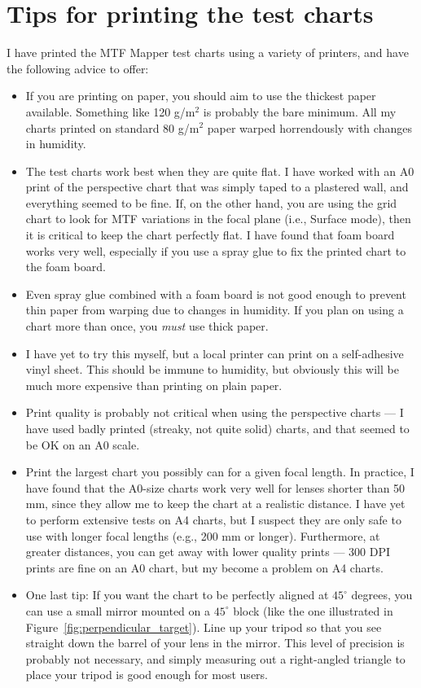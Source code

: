 \documentclass[a4paper]{article}
\begin{document}
\appendix

\section{Tips for printing the test charts}
\label{sec:tips}
I have printed the MTF Mapper test charts using a variety of printers, and
have the following advice to offer:
\begin{itemize}
  \item If you are printing on paper, you should aim to use the thickest
  paper available. Something like 120 g/m$^2$ is probably the bare minimum.
  All my charts printed on standard 80 g/m$^2$ paper warped horrendously
  with changes in humidity.
  \item The test charts work best when they are quite flat. I have worked
  with an A0 print of the perspective chart that was simply taped to a
  plastered wall, and everything seemed to be fine. If, on the other hand,
  you are using the grid chart to look for MTF variations in the focal plane
  (i.e., Surface mode), then it is critical to keep the chart perfectly
  flat. I have found that foam board works very well, especially if you use
  a spray glue to fix the printed chart to the foam board.
  \item Even spray glue combined with a foam board is not good enough to
  prevent thin paper from warping due to changes in humidity. If you plan on
  using a chart more than once, you \emph{must} use thick paper.
  \item I have yet to try this myself, but a local printer can print on a
  self-adhesive vinyl sheet. This should be immune to humidity, but
  obviously this will be much more expensive than printing on plain paper.
  \item Print quality is probably not critical when using the perspective
  charts --- I have used badly printed (streaky, not quite solid) charts,
  and that seemed to be OK on an A0 scale.
  \item Print the largest chart you possibly can for a given focal length.
  In practice, I have found that the A0-size charts work very well for
  lenses shorter than 50 mm, since they allow me to keep the chart at a 
  realistic distance. I have yet to perform extensive tests on A4 charts, 
  but I suspect they are only safe to  use with longer focal lengths 
  (e.g., 200 mm or longer). Furthermore, at greater distances, you can get
  away with lower quality prints --- 300 DPI prints are fine on an A0 chart,
  but my become a problem on A4 charts.
  \item One last tip: If you want the chart to be perfectly aligned at
  $45^\circ$ degrees, you can use a small mirror mounted on a $45^\circ$ block
  (like the one illustrated in Figure~\ref{fig:perpendicular_target}). Line
  up your tripod so that you see straight down the barrel of your lens in
  the mirror. This level of precision is probably not necessary, and simply
  measuring out a right-angled triangle to place your tripod is good enough
  for most users.
\end{itemize}
\end{document}

